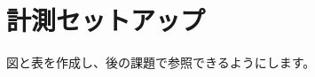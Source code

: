 \documentclass[dvipdfmx]{jlreq}
\begin{document}

\section{計測セットアップ}

図と表を作成し、後の課題で参照できるようにします。


\end{document}
